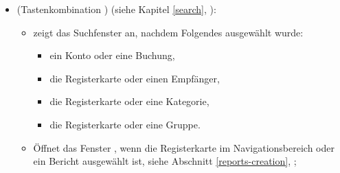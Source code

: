 \begin{itemize}
	\item {} (Tastenkombination ) (siehe Kapitel \vref{search}, ):
		\begin{itemize}
			\item zeigt das Suchfenster an, nachdem Folgendes ausgewählt wurde:
			\begin{itemize}
				\item ein Konto oder eine Buchung,
				\item die Registerkarte  oder einen Empfänger,
				\item die Registerkarte  oder eine Kategorie,
				\item die Registerkarte  oder eine Gruppe.
			\end{itemize}
			\item Öffnet das Fenster , wenn die Registerkarte  im Navigationsbereich oder ein Bericht ausgewählt ist, siehe Abschnitt \vref{reports-creation}, ;

\end{itemize}
\end{itemize}
